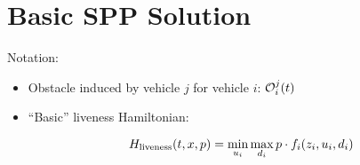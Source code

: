 \section{Basic SPP Solution\label{sec:basic}}
Notation:
\begin{itemize}
\item Obstacle induced by vehicle $j$ for vehicle $i$: $\mathcal{O}_i^j(t)$
\item ``Basic'' liveness Hamiltonian:

\begin{equation}
H_\text{liveness}(t, x, p) = \min_{u_i} \max_{d_i} p \cdot f_i(z_i, u_i, d_i)
\end{equation}

\end{itemize}
